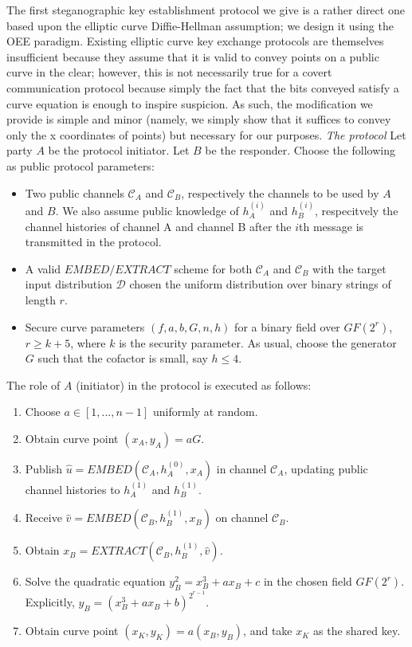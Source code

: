 \documentclass{article}
\begin{document}
The first steganographic key establishment protocol we give is a rather direct one based upon the elliptic curve 
Diffie-Hellman assumption; we design it using the OEE paradigm.  Existing elliptic curve key exchange protocols 
are themselves insufficient because they assume that it is valid to convey points on a public curve in the clear; 
however, this is not necessarily true for a covert 
communication protocol because simply the fact that the bits conveyed satisfy a curve equation is enough to 
inspire suspicion.  As such, the modification we provide is simple and minor (namely, we 
simply show that it suffices to convey only the x coordinates of points) but necessary for our purposes.
\newline\newline
\noindent \textit{The protocol } Let party $A$ be the protocol initiator.  Let $B$ be the 
responder.  Choose the following as public protocol parameters:
\begin{itemize}
\item{Two public channels $\mathcal{C}_A$ and $\mathcal{C}_B$, respectively the channels to 
be used by $A$ and $B$.  We also assume public knowledge of $h_A^{(i)}$ and $h_B^{(i)}$, respecitvely 
the channel histories of channel A and channel B after the $i$th message is transmitted in the protocol.}
\item{A valid $EMBED/EXTRACT$ scheme for both $\mathcal{C}_A$ and $\mathcal{C}_B$ with the target input 
distribution $\mathcal{D}$ chosen the uniform distribution over binary strings of length $r$.}
\item{Secure curve parameters $(f,a,b,G,n,h)$ for a binary field over $GF(2^r)$, $r \geq k + 5$, where
$k$ is the security parameter.  As usual, choose the generator $G$ such that the cofactor is small, say 
$h \leq 4$.}
\end{itemize}

\noindent The role of $A$ (initiator) in the protocol is executed as follows:
\begin{enumerate}
\item{Choose $a \in [1,...,n-1]$ uniformly at random.}
\item{Obtain curve point $(x_A, y_A) = aG$.}
\item{Publish $\hat{u}=EMBED(\mathcal{C}_A, h_A^{(0)},x_A)$ in channel $\mathcal{C}_{A}$, updating 
public channel histories to $h_{A}^{(1)}$ and $h_B^{(1)}$.}
\item{Receive $\hat{v}=EMBED(\mathcal{C}_B, h_B^{(1)},x_B)$ on channel $\mathcal{C}_{B}$.}
\item{Obtain $x_B = EXTRACT(\mathcal{C}_B, h_B^{(1)}, \hat{v})$.}
\item{Solve the quadratic equation $y_B^2=x_B^3 + ax_B + c$ in the chosen field $GF(2^r)$.  
Explicitly, $y_B = (x_B^3 + ax_B + b)^{2^{r-1}}$.}
\item{Obtain curve point $(x_K,y_K) = a(x_B, y_B)$, and take $x_K$ as the shared key.}
\end{enumerate}
\end{document}
